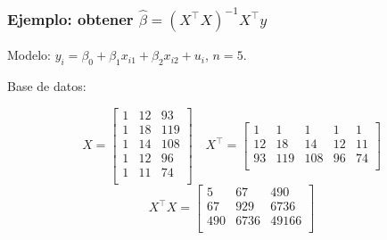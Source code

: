\documentclass{beamer}
\begin{document}
\begin{frame}[shrink=10]
\frametitle{Ejemplo: obtener $\hat{\beta} = (X^\top X)^{-1}X^\top y$}

Modelo: $y_i = \beta_0 + \beta_1 x_{i1} + \beta_2 x_{i2} + u_i$, $n=5$.

Base de datos: \begin{center}
\end{center}

\[
X = \begin{bmatrix}
1 & 12 & 93 \\
1 & 18 & 119 \\
1 & 14 & 108 \\
1 & 12 & 96 \\
1 & 11 & 74 \\
\end{bmatrix} \quad 
X^\top = \begin{bmatrix}
1 & 1 & 1 & 1 & 1 \\
12 & 18 & 14 & 12 & 11 \\
93 & 119 & 108 & 96 & 74 \\
\end{bmatrix}
\]
\[
X^\top X = \begin{bmatrix}
5 & 67 & 490 \\
67 & 929 & 6736 \\
490 & 6736 & 49166 \\
\end{bmatrix}
\]
\end{frame}
\end{document}
